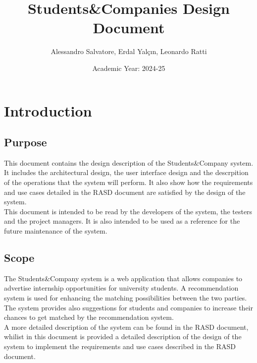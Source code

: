 \documentclass[a4paper,12pt]{article}
\begin{document}
\title{Students\&Companies Design Document} %
\author{Alessandro Salvatore, Erdal Yalçın, Leonardo Ratti}
\date{Academic Year: 2024-25}
\maketitle


\newpage
\tableofcontents
\section{Introduction}
\subsection{Purpose}
This document contains the design description of the Students\&Company system. It includes
the architectural design, the user interface design and the descrpition of the operations
that the system will perform. It also show how the requirements and use cases detailed
in the RASD document are satisfied by the design of the system. \\ \newline 
This document is intended to be read by the developers of the system, the testers and the
project managers. It is also intended to be used as a reference for the future maintenance
of the system.
\subsection{Scope}
The Students\&Company system is a web application that allows companies to advertise internship opportunities
for university students. A recommendation system is used for enhancing the matching possibilities between the two parties.
The system provides also suggestions for students and companies to increase their chances to get matched by the recommendation system. \\ \newline
A more detailed description of the system can be found in the RASD document, whilist in
this document is provided a detailed description of the design of the system to implement
the requirements and use cases described in the RASD document.
\end{document}
